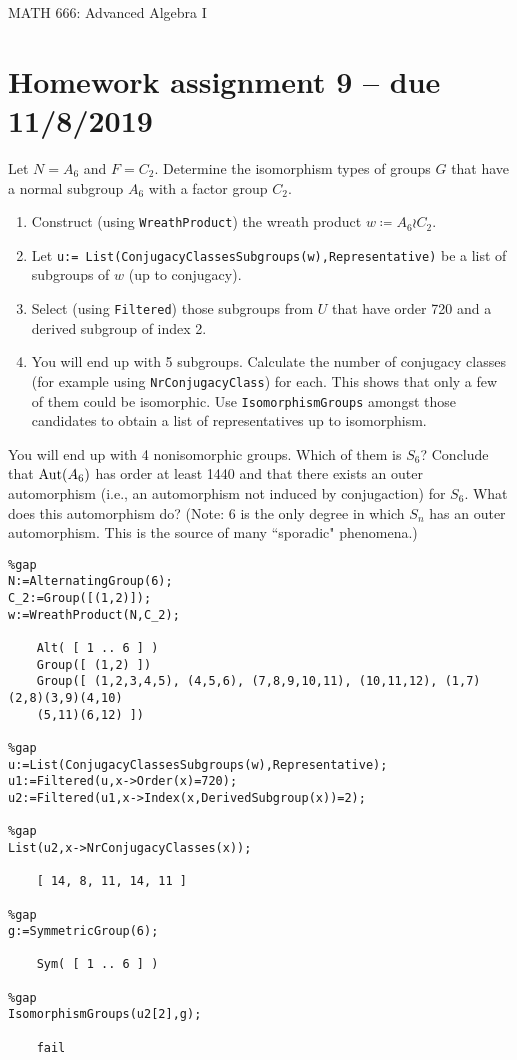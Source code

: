 \documentclass[leqno]{article}
\author{Colin Roberts}
\begin{document}
\begin{center}
  \begin{huge}
    MATH 666: Advanced Algebra I
  \end{huge}
\end{center}

\section*{Homework assignment 9 -- due 11/8/2019}
\setcounter{problem}{36}

\begin{problem}
Let $N=A_6$ and $F=C_2$. Determine the isomorphism types of groups $G$ that have a normal subgroup $A_6$ with a factor group $C_2$.
\begin{enumerate}[1.]
    \item Construct (using \verb"WreathProduct") the wreath product $w\coloneqq A_6 \wr C_2$.
    \item Let \verb"u:= List(ConjugacyClassesSubgroups(w),Representative)" be a list of subgroups of $w$ (up to conjugacy).
    \item Select (using \verb"Filtered") those subgroups from $U$ that have order 720 and a derived subgroup of index 2.
    \item You will end up with 5 subgroups. Calculate the number of conjugacy classes (for example using \verb"NrConjugacyClass") for each. This shows that only a few of them could be isomorphic. Use \verb"IsomorphismGroups" amongst those candidates to obtain a list of representatives up to isomorphism.
\end{enumerate}
You will end up with 4 nonisomorphic groups. Which of them is $S_6$? Conclude that $\mathrm{Aut}(A_6)$ has order at least 1440 and that there exists an outer automorphism (i.e., an automorphism not induced by conjugaction) for $S_6$. What does this automorphism do? (Note: 6 is the only degree in which $S_n$ has an outer automorphism. This is the source of many ``sporadic" phenomena.)
\end{problem}
\begin{solution}
\begin{verbatim}
%gap
N:=AlternatingGroup(6);
C_2:=Group([(1,2)]);
w:=WreathProduct(N,C_2);

    Alt( [ 1 .. 6 ] )
    Group([ (1,2) ])
    Group([ (1,2,3,4,5), (4,5,6), (7,8,9,10,11), (10,11,12), (1,7)(2,8)(3,9)(4,10)
    (5,11)(6,12) ])

%gap
u:=List(ConjugacyClassesSubgroups(w),Representative);
u1:=Filtered(u,x->Order(x)=720);
u2:=Filtered(u1,x->Index(x,DerivedSubgroup(x))=2);

%gap
List(u2,x->NrConjugacyClasses(x));

    [ 14, 8, 11, 14, 11 ]

%gap
g:=SymmetricGroup(6);

    Sym( [ 1 .. 6 ] )

%gap
IsomorphismGroups(u2[2],g);

    fail
\end{verbatim}
\end{solution}
\end{document}
